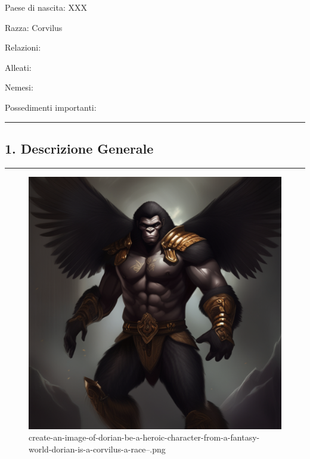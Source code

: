 Paese di nascita: XXX

Razza: Corvilus

Relazioni:

Alleati:

Nemesi:

Possedimenti importanti:

\begin{center}\rule{0.5\linewidth}{0.5pt}\end{center}

\subsection{1. Descrizione Generale}\label{descrizione-generale}

\begin{center}\rule{0.5\linewidth}{0.5pt}\end{center}

\begin{figure}
\centering
\includegraphics{create-an-image-of-dorian-be-a-heroic-character-from-a-fantasy-world-dorian-is-a-corvilus-a-race--.png}
\caption{create-an-image-of-dorian-be-a-heroic-character-from-a-fantasy-world-dorian-is-a-corvilus-a-race--.png}
\end{figure}

